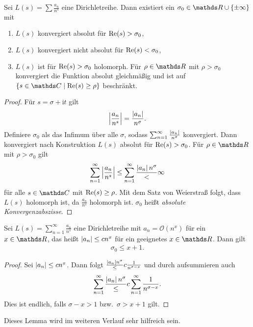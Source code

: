 \begin{prop}
Sei $L(s)=\sum \frac{a_n}{n^s}$ eine Dirichletreihe.
Dann existiert ein $\sigma_0 \in \R \cup \{\pm \infty\}$ mit
\begin{enumerate}
\item $L(s)$ konvergiert absolut für $\operatorname{Re}(s)>\sigma_0$,
\item $L(s)$ konvergiert nicht absolut für $\operatorname{Re}(s)<\sigma_0$,
\item $L(s)$ ist für $\operatorname{Re}(s)>\sigma_0$ holomorph. Für $\rho \in \R$
mit $\rho >\sigma_0$ konvergiert die Funktion absolut gleichmäßig und ist auf $\{s \in \C \mid \Ret(s)\geq \rho\}$ beschränkt.
\end{enumerate}
\end{prop}
\begin{proof}
Für $s=\sigma+\mathrm{i}t$ gilt
\begin{align*}
\left\vert\frac{a_n}{n^s}\right\vert=\frac{\left\vert a_n\right\vert}{n^\sigma}.
\end{align*}
Definiere $\sigma_0$ als das Infimum über alle $\sigma$, sodass $\sum_{n=1}^\infty \frac{\left\vert a_n\right\vert}{n^\sigma}$ konvergiert.
Dann konvergiert nach Konstruktion $L(s)$ absolut für $\operatorname{Re}(s)>\sigma_0$.
Für $\rho \in \R$ mit $\rho>\sigma_0$ gilt
\begin{align*}
\sum_{n=1}^\infty \left\vert\frac{a_n}{n^s}\right\vert \leq \sum_{n=1}^\infty \frac{\left\vert a_n\right\vert{n^\sigma}}<\infty
\end{align*}
für alle $s\in \C$ mit $\operatorname{Re}(s)\geq \rho$.
Mit dem Satz von Weierstraß folgt, dass $L(s)$ holomorph ist, da $\frac{a_n}{n^s}$ holomorph ist.
$\sigma_0$ heißt \emph{absolute Konvergenzabszisse}.
\end{proof}

\begin{lem}
Sei $L(s)=\sum_{n=1}^\infty \frac{a_n}{n^s}$ eine Dirichletreihe mit
$a_n =\mathcal{O}(n^x)$ für ein $x\in \R$, das heißt
$\left\vert a_n\right\vert \leq cn^x$ für ein geeignetes $x \in \R$.
Dann gilt 
\begin{align*}
\sigma_0\leq x+1.
\end{align*}
\end{lem}
\begin{proof}
Sei $\left\vert a_n\right\vert\leq cn^x$. Dann folgt $\frac{\left\vert a_n\right\vert{n^\sigma}} \leq c \frac{1}{n^{\sigma-x}}$ und durch aufsummieren auch
\begin{align*}
\sum_{n=1}^\infty \frac{\left\vert a_n\right\vert{n^\sigma}} \leq c \sum_{n=1}^\infty \frac{1}{n^{\sigma-x}}.
\end{align*}
Dies ist endlich, falls $\sigma-x>1$ bzw.\, $\sigma>x+1$ gilt.
\end{proof}
Dieses Lemma wird im weiteren Verlauf sehr hilfreich sein.

